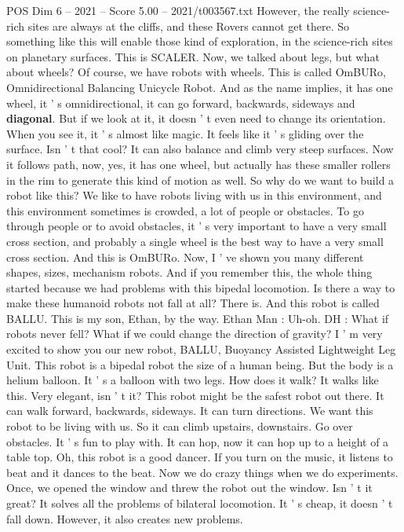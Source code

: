 \begin{textsample}{POS Dim 6 – 2021 – Score 5.00 – 2021/t003567.txt}
However, the really science-rich sites are always at the cliffs, and these Rovers cannot get there.
So something like this will enable those kind of exploration, in the science-rich sites on planetary surfaces.
This is SCALER.
Now, we talked about legs, but what about wheels?
Of course, we have robots with wheels.
This is called OmBURo, Omnidirectional Balancing Unicycle Robot.
And as the name implies, it has one wheel, it ' s omnidirectional, it can go forward, backwards, sideways and \textbf{diagonal}.
But if we look at it, it doesn ' t even need to change its orientation.
When you see it, it ' s almost like magic.
It feels like it ' s gliding over the surface.
Isn ' t that cool?
It can also balance and climb very steep surfaces.
Now it follows path, now, yes, it has one wheel, but actually has these smaller rollers in the rim to generate this kind of motion as well.
So why do we want to build a robot like this?
We like to have robots living with us in this environment, and this environment sometimes is crowded, a lot of people or obstacles.
To go through people or to avoid obstacles, it ' s very important to have a very small cross section, and probably a single wheel is the best way to have a very small cross section.
And this is OmBURo.
Now, I ' ve shown you many different shapes, sizes, mechanism robots.
And if you remember this, the whole thing started because we had problems with this bipedal locomotion.
Is there a way to make these humanoid robots not fall at all?
There is.
And this robot is called BALLU.
This is my son, Ethan, by the way.
Ethan Man : Uh-oh.
DH : What if robots never fell?
What if we could change the direction of gravity?
I ' m very excited to show you our new robot, BALLU, Buoyancy Assisted Lightweight Leg Unit.
This robot is a bipedal robot the size of a human being.
But the body is a helium balloon.
It ' s a balloon with two legs.
How does it walk?
It walks like this.
Very elegant, isn ' t it?
This robot might be the safest robot out there.
It can walk forward, backwards, sideways.
It can turn directions.
We want this robot to be living with us.
So it can climb upstairs, downstairs.
Go over obstacles.
It ' s fun to play with.
It can hop, now it can hop up to a height of a table top.
Oh, this robot is a good dancer.
If you turn on the music, it listens to beat and it dances to the beat.
Now we do crazy things when we do experiments.
Once, we opened the window and threw the robot out the window.
Isn ' t it great?
It solves all the problems of bilateral locomotion.
It ' s cheap, it doesn ' t fall down.
However, it also creates new problems.

\end{textsample}

